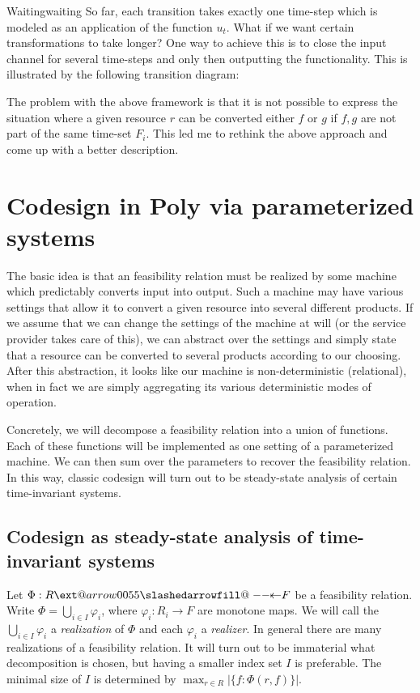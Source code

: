 \documentclass[12pt, a4paper]{article}
\makeatletter
\theoremstyle{definition}
\theoremstyle{plain}
\theoremstyle{plain}
\theoremstyle{plain}
\theoremstyle{plain}
\theoremstyle{plain}
\theoremstyle{remark}
\theoremstyle{remark}
\def\slashedarrowfill@#1#2#3#4#5{%
	$\m@th\thickmuskip0mu\medmuskip\thickmuskip\thinmuskip\thickmuskip
	\relax#5#1\mkern-7mu%
	\cleaders\hbox{$#5\mkern-2mu#2\mkern-2mu$}\hfill
	\mathclap{#3}\mathclap{#2}%
	\cleaders\hbox{$#5\mkern-2mu#2\mkern-2mu$}\hfill
	\mkern-7mu#4$%
}
\def\leftslashedarrowfill@{%
	\slashedarrowfill@\relbar\relbar\mapstochar\leftarrow}
\newcommand\xslashedleftarrow[2][]{%
	\ext@arrow 0055{\leftslashedarrowfill@}{#1}{#2}}
\newcommand{\bprof}{\xslashedleftarrow{}}
\makeatother
\begin{document}
\begin{tcexample}{Waiting}{waiting}
    So far, each transition takes exactly one time-step which is modeled as an application of the function $u_t$. What if we want certain transformations to take longer? One way to achieve this is to close the input channel for several time-steps and only then outputting the functionality. This is illustrated by the following transition diagram:

\end{tcexample}

The problem with the above framework is that it is not possible to express the situation where a given resource $r$ can be converted either $f$ or $g$ if $f,g$ are not part of the same time-set $F_i$. This led me to rethink the above approach and come up with a better description.

\section{Codesign in \textsf{Poly} via parameterized systems}\label{sec:parameterized-systems}
The basic idea is that an feasibility relation must be realized by some machine which predictably converts input into output. Such a machine may have various settings that allow it to convert a given resource into several different products. If we assume that we can change the settings of the machine at will (or the service provider takes care of this), we can abstract over the settings and simply state that a resource can be converted to several products according to our choosing. After this abstraction, it looks like our machine is non-deterministic (relational), when in fact we are simply aggregating its various deterministic modes of operation.

Concretely, we will decompose a feasibility relation into a union of functions. Each of these functions will be implemented as one setting of a parameterized machine. We can then sum over the parameters to recover the feasibility relation. In this way, classic codesign will turn out to be steady-state analysis of certain time-invariant systems.

\subsection{Codesign as steady-state analysis of time-invariant systems}
Let $\Phi: R \bprof F$ be a feasibility relation. Write $\Phi = \bigcup_{i \in I} \varphi_i$, where $\varphi_i: R_i \rightarrow F$ are monotone maps. We will call the $\bigcup_{i \in I} \varphi_i$ a \emph{realization} of $\Phi$ and each $\varphi_i$ a \emph{realizer}. In general there are many realizations of a feasibility relation. It will turn out to be immaterial what decomposition is chosen, but having a smaller index set $I$ is preferable. The minimal size of $I$ is determined by $\max_{r \in R}{| \{f : \Phi(r,f) \} |}$.
\end{document}
